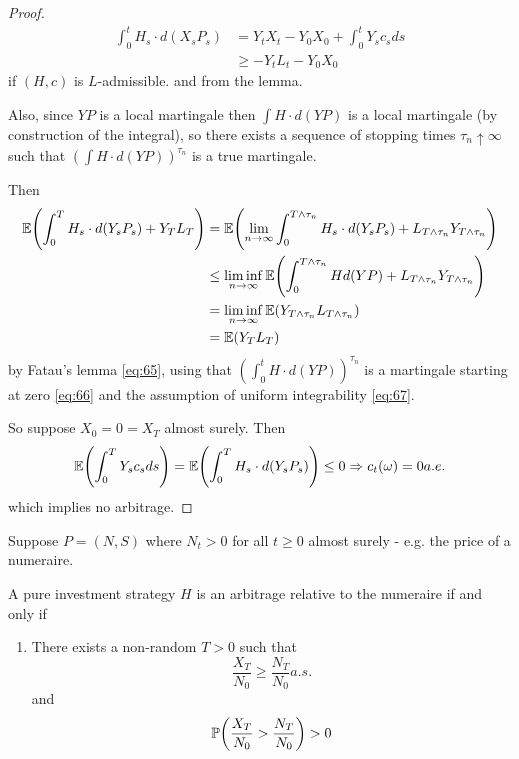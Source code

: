 \begin{proof}
  \begin{align}
    \label{eq:63}
    \int_{0}^{t} H_{s} \cdot d(X_{s} P_{s}) &= Y_{t} X_{t} - Y_{0}
    X_{0} + \int_{0}^{t} Y_{s} c_{s} ds \\
    &\geq -Y_{t} L_{t} - Y_{0} X_{0}
  \end{align}  if $(H, c)$ is $L$-admissible. and from the lemma.

  Also, since $YP$ is a local martingale then $\int H \cdot d(YP)$ is
  a local martingale (by construction of the \ito integral), so there
  exists a sequence of stopping times $\tau_{n} \uparrow \infty$ such
  that $(\int H \cdot d(YP))^{\tau_{n}}$ is a true martingale.

  Then
  \begin{align}
    \label{eq:64}
    \E{\int_{0}^{T} H_{s} \cdot d(Y_{s} P_{s}) + Y_{T}L_{T}} &=
    \E{\lim_{n \rightarrow \infty} \int_{0}^{T \wedge \tau_{n}} H_{s}
      \cdot d(Y_{s} P_{s}) + L_{T \wedge \tau_{n}} Y_{T \wedge
        \tau_{n}} } \\
    \label{eq:65}
    &\leq \liminf_{n \rightarrow \infty} \E{\int_{0}^{T \wedge
        \tau_{n}} H d(YP) + L_{T \wedge \tau_{n}} Y_{T \wedge
        \tau_{n}}} \\
    \label{eq:66}
    &= \liminf_{n \rightarrow \infty} \E{Y_{T \wedge \tau_{n}} L_{T
        \wedge \tau_{n}}} \\
    \label{eq:67}
     &= \E{Y_{T} L_{T}}
  \end{align} by Fatau's lemma \eqref{eq:65}, using that $(\int_{0}^{t} H \cdot d(YP))^{\tau_{n}}$ is a
  martingale starting at zero \eqref{eq:66} and the assumption of
  uniform integrability \eqref{eq:67}.

  So suppose $X_{0} = 0 = X_{T}$ almost surely. Then
  \begin{align}
    \label{eq:68}
    \E{\int_{0}^{T} Y_{s} c_{s} ds} = \E{\int_{0}^{T} H_{s} \cdot
      d(Y_{s} P_{s})} \leq 0 \Rightarrow c_{t}(\omega) = 0 a.e.
  \end{align} which implies no arbitrage.
\end{proof}


Suppose $P = (N, S)$ where $N_{t} > 0$ for all $t \geq 0$ almost
surely - e.g. the price of a numeraire.

\begin{defn}
  \label{defn:continuous_time:27}
  A pure investment strategy $H$ is an arbitrage relative to the
  numeraire if and only if
  \begin{enumerate}
  \item There exists a non-random $T > 0$ such that
    \begin{equation}
      \label{eq:69}
      \frac{X_{T}}{N_{0}} \geq \frac{N_{T}}{N_{0}} a.s.
    \end{equation} and
    \begin{equation}
      \label{eq:70}
      \Prob{\frac{X_{T}}{N_{0}} > \frac{N_{T}}{N_{0}}} > 0
    \end{equation}
  \end{enumerate}
\end{defn}

